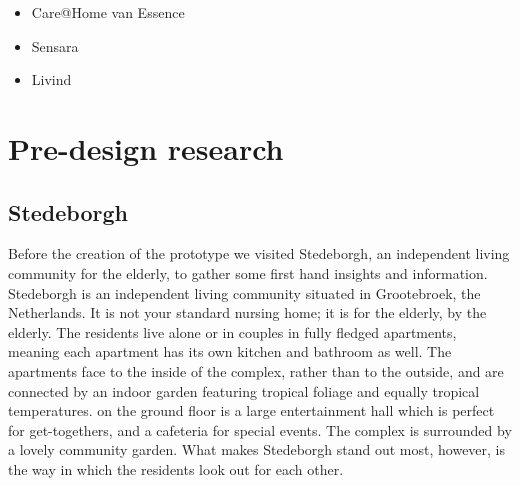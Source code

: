 \documentclass{below-ext}
\begin{document}
\begin{itemize}
\item Care@Home van Essence
\item Sensara
\item Livind
\end{itemize}


\section{Pre-design research}

\subsection{Stedeborgh}

Before the creation of the prototype we visited Stedeborgh, an independent living community for the elderly, to gather some first hand insights and information. Stedeborgh is an independent living community situated in Grootebroek, the Netherlands.  It is not your standard nursing home; it is for the elderly, by the elderly. The residents live alone or in couples in fully fledged apartments, meaning each apartment has its own kitchen and bathroom as well. The apartments face to the inside of the complex, rather than to the outside, and are connected by an indoor garden featuring tropical foliage and equally tropical temperatures. on the ground floor is a large entertainment hall which is perfect for get-togethers, and a cafeteria for special events. The complex is surrounded by a lovely community garden. What makes Stedeborgh stand out most, however, is the way in which the residents look out for each other.
\end{document}
